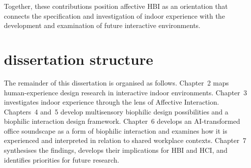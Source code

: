 Together, these contributions position affective HBI as an orientation that connects the specification and investigation of indoor experience with the development and examination of future interactive environments.

\section{dissertation structure} 
The remainder of this dissertation is organised as follows. Chapter~2 maps human-experience design research in interactive indoor environments. Chapter~3 investigates indoor experience through the lens of Affective Interaction. Chapters~4 and~5 develop multisensory biophilic design possibilities and a biophilic interaction design framework. Chapter~6 develops an AI-transformed office soundscape as a form of biophilic interaction and examines how it is experienced and interpreted in relation to shared workplace contexts. Chapter~7 synthesises the findings, develops their implications for HBI and HCI, and identifies priorities for future research.
